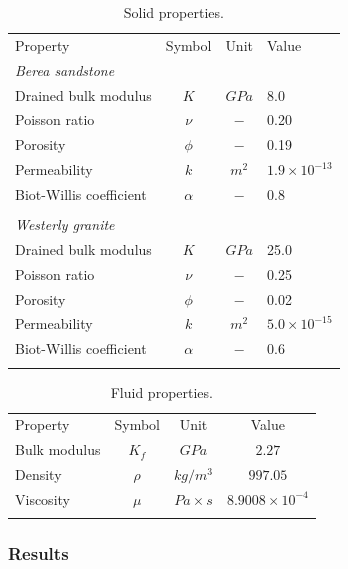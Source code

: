\begin{table}[!htb]
\begin{center}
\begin{tabular}{lccl}
\hline\noalign{\smallskip}
Property & Symbol & Unit & Value \\
\noalign{\smallskip}\hline\noalign{\smallskip}
\textit{Berea sandstone} & & & \\
Drained bulk modulus & $K$ & $GPa$ & 8.0 \\
Poisson ratio & $\nu $ & $-$ & 0.20 \\
Porosity & $\phi $ & $-$ & 0.19 \\
Permeability & $k$ & $m^{2}$ & $1.9\times 10^{-13}$ \\
Biot-Willis coefficient & $\alpha $ & $-$ & 0.8 \\
 & & & \\
\textit{Westerly granite} & & & \\
Drained bulk modulus & $K$ & $GPa$ & 25.0 \\
Poisson ratio & $\nu $ & $-$ & 0.25 \\
Porosity & $\phi $ & $-$ & 0.02 \\
Permeability & $k$ & $m^{2}$ & $5.0\times 10^{-15}$ \\
Biot-Willis coefficient & $\alpha $ & $-$ & 0.6 \\
\noalign{\smallskip}\hline
\end{tabular}
\end{center}
\caption{Solid properties.}
\label{terz:tab2}
\end{table}

\begin{table}[!htb]
\begin{center}
\begin{tabular}{lccc}
\hline\noalign{\smallskip}
Property & Symbol & Unit & Value \\
\noalign{\smallskip}\hline\noalign{\smallskip}
Bulk modulus   & $K_{f}$      & $GPa$         & $2.27$ \\
Density        & $\rho $      & $kg/m^3$      & $997.05$ \\
Viscosity      & $\mu $       & $Pa\times s$    & $8.9008\times 10^{-4}$ \\
\noalign{\smallskip}\hline
\end{tabular}
\end{center}
\caption{Fluid properties.}
\label{terz:tab3}
\end{table}

\subsubsection*{Results}

